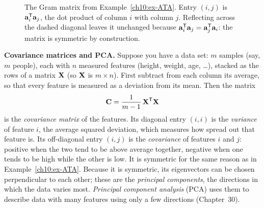 \begin{figure}[H]
\centering
{}
\caption{The Gram matrix from Example~\ref{ch10:ex-ATA}. Entry $(i,j)$ is $\mathbf{a}_i^{\mathsf{T}}\mathbf{a}_j$, the
dot product of column $i$ with column $j$. Reflecting across the dashed diagonal leaves it unchanged
because $\mathbf{a}_i^{\mathsf{T}}\mathbf{a}_j=\mathbf{a}_j^{\mathsf{T}}\mathbf{a}_i$: the matrix is symmetric by construction.}
\label{ch10:fig-gram}
\end{figure}

\begin{applicationbox}
\textbf{Covariance matrices and PCA.} Suppose you have a data set: $m$ samples (say, $m$ people),
each with $n$ measured features (height, weight, age, \dots), stacked as the rows of a matrix
$\mathbf{X}$ (so $\mathbf{X}$ is $m\times n$). First subtract from each column its average, so that every
feature is measured as a deviation from its mean. Then the matrix
\[
  \mathbf{C} = \frac{1}{m-1}\,\mathbf{X}^{\mathsf{T}}\mathbf{X}
\]
is the \emph{covariance matrix} of the features. Its diagonal entry $(i,i)$ is the \emph{variance}
of feature $i$, the average squared deviation, which measures how spread out that feature is. Its
off-diagonal entry $(i,j)$ is the \emph{covariance} of features $i$ and $j$: positive when the two
tend to be above average together, negative when one tends to be high while the other is low. It
is symmetric for the same reason as in Example~\ref{ch10:ex-ATA}. Because it is symmetric, its
eigenvectors can be chosen perpendicular to each other; these are the \emph{principal components},
the directions in which the data varies most. \emph{Principal component analysis} (PCA) uses them
to describe data with many features using only a few directions (Chapter~30).
\end{applicationbox}

